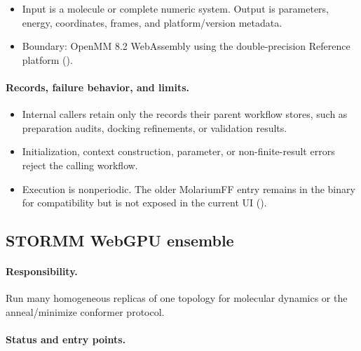\documentclass[11pt]{article}
\begin{document}
\begin{small}
\begin{itemize}[leftmargin=*]

\item Input is a molecule or complete numeric system. Output is parameters, energy, coordinates, frames, and platform/version metadata.

\item Boundary: OpenMM 8.2 WebAssembly using the double-precision Reference platform ().

\end{itemize}

\paragraph{Records, failure behavior, and limits.}

\begin{itemize}[leftmargin=*]

\item Internal callers retain only the records their parent workflow stores, such as preparation audits, docking refinements, or validation results.

\item Initialization, context construction, parameter, or non-finite-result errors reject the calling workflow.

\item Execution is nonperiodic. The older MolariumFF entry remains in the binary for compatibility but is not exposed in the current UI ().

\end{itemize}

\subsection{STORMM WebGPU ensemble}\label{appB:sec13}

\paragraph{Responsibility.}

Run many homogeneous replicas of one topology for molecular dynamics or the anneal/minimize conformer protocol.

\paragraph{Status and entry points.}


\end{small}
\end{document}

